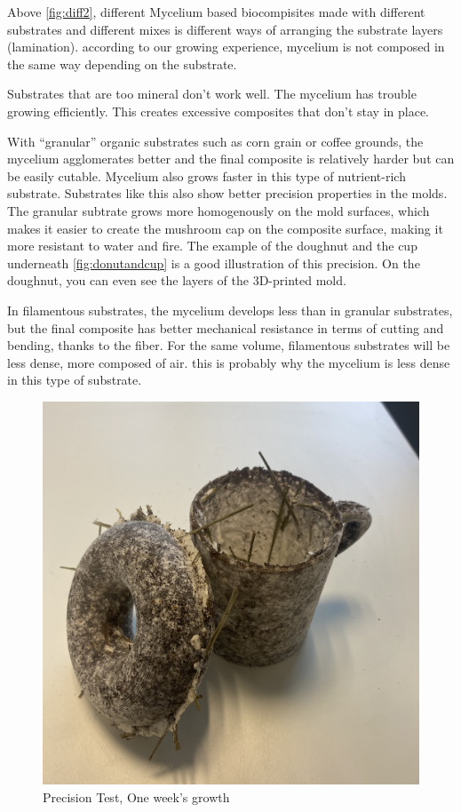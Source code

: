 Above \ref{fig:diff2}, different Mycelium based biocompisites made with different substrates and different mixes is different ways of arranging the substrate layers (lamination). 
according to our growing experience, mycelium is not composed in the same way depending on the substrate. 

Substrates that are too mineral don't work well. The mycelium has trouble growing efficiently. This creates excessive composites that don't stay in place. 

With “granular” organic substrates such as corn grain or coffee grounds, the mycelium agglomerates better and the final composite is relatively harder but can be easily cutable. Mycelium also grows faster in this type of nutrient-rich substrate. 
Substrates like this also show better precision properties in the molds. The granular subtrate grows more homogenously on the mold surfaces, which makes it easier to create the mushroom cap on the composite surface, making it more resistant to water and fire. The example of the doughnut and the cup underneath \ref{fig:donutandcup} is a good illustration of this precision. On the doughnut, you can even see the layers of the 3D-printed mold. 

In filamentous substrates, the mycelium develops less than in granular substrates, but the final composite has better mechanical resistance in terms of cutting and bending, thanks to the fiber. 
For the same volume, filamentous substrates will be less dense, more composed of air. this is probably why the mycelium is less dense in this type of substrate.


\begin{figure}[h]
    \centering
    \includegraphics{images/IMG_3482.jpg}
    \caption{Precision Test, One week's growth}
    \label{fig:donutandcupbefore}
\end{figure} 

